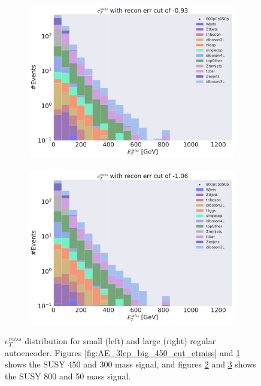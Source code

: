 \begin{figure}[H]
\begin{subfigure}{.45\textwidth}
        \caption{}
        \label{fig:AE_3lep_small_450_cut_etmiss}
    \end{subfigure}
    \hfill
    \begin{subfigure}{.45\textwidth}
        \includegraphics[width=\textwidth]{Figures/AE_testing/big/3lep/b_data_recon_big_rm3_feats_sig_800p0p050p_etmiss_recon_errcut_-0.93.pdf}
        \caption{}
        \label{fig:AE_3lep_big_800_cut_etmiss}
    \end{subfigure}
    \hfill   
    \begin{subfigure}{.45\textwidth}
        \includegraphics[width=\textwidth]{Figures/AE_testing/small/3lep/b_data_recon_big_rm3_feats_sig_800p0p050p_etmiss_recon_errcut_-1.06.pdf}
        \caption{}
        \label{fig:AE_3lep_small_800_cut_etmiss}
    \end{subfigure}
    \hfill      
    \caption[Some $e_T^{miss}$ cuts for AE]{$e_T^{miss}$ distribution for small (left) and large (right) regular autoencoder.
    Figures \ref{fig:AE_3lep_big_450_cut_etmiss} and \ref{fig:AE_3lep_small_450_cut_etmiss} shows the SUSY 450 and 300 mass signal, 
    and figures \ref{fig:AE_3lep_big_800_cut_etmiss} and \ref{fig:AE_3lep_small_800_cut_etmiss} shows the SUSY 800 and 50 mass signal.}
    \label{fig:AE_3lep_recon_err_both_sig_cut_etmiss}
\end{figure}

